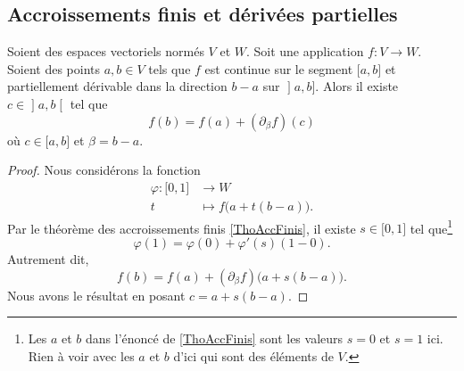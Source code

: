 \subsection{Accroissements finis et dérivées partielles}

\begin{proposition}     \label{PROPooCAWBooINcNxj}
    Soient des espaces vectoriels normés \( V\) et \( W\). Soit une application \( f\colon V\to W\). Soient des points \( a,b\in V\) tels que \( f\) est continue sur le segment \( \mathopen[ a , b \mathclose]\) et partiellement dérivable dans la direction \( b-a\) sur \( \mathopen] a , b \mathclose]\). Alors il existe \( c\in\mathopen] a , b \mathclose[\) tel que
        \begin{equation}
            f(b)=f(a)+(\partial_{\beta}f)(c)
        \end{equation}
        où \( c\in \mathopen[ a , b \mathclose]\) et \( \beta=b-a\).
\end{proposition}

\begin{proof}
   Nous considérons la fonction
   \begin{equation}
       \begin{aligned}
           \varphi\colon \mathopen[ 0 , 1 \mathclose]&\to W \\
           t&\mapsto f\big( a+t(b-a) \big). 
       \end{aligned}
   \end{equation}
   Par le théorème des accroissements finis \ref{ThoAccFinis}, il existe \( s\in \mathopen[ 0 , 1 \mathclose]\) tel que\footnote{Les \( a\) et \( b\) dans l'énoncé de \ref{ThoAccFinis} sont les valeurs \( s=0\) et \( s=1\) ici. Rien à voir avec les \( a\) et \( b\) d'ici qui sont des éléments de \( V\).}
   \begin{equation}
       \varphi(1)=\varphi(0)+\varphi'(s)(1-0).
   \end{equation}
   Autrement dit,
   \begin{equation}
       f(b)=f(a)+(\partial_{\beta}f)\big( a+s(b-a) \big).
   \end{equation}
   Nous avons le résultat en posant \( c=a+s(b-a)\).
\end{proof}

